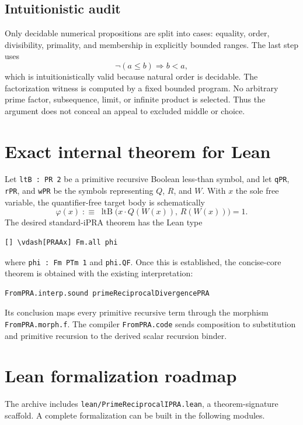 \documentclass[11pt]{article}
\theoremstyle{definition}
\newcommand{\ProdP}{Q}
\newcommand{\NumP}{R}
\newcommand{\Wit}{W}
\newcommand{\code}[1]{\texttt{#1}}
\begin{document}
\subsection{Intuitionistic audit}

Only decidable numerical propositions are split into cases: equality, order,
divisibility, primality, and membership in explicitly bounded ranges.  The
last step uses
\[
 \neg(a\leq b)\Longrightarrow b<a,
\]
which is intuitionistically valid because natural order is decidable.  The
factorization witness is computed by a fixed bounded program.  No arbitrary
prime factor, subsequence, limit, or infinite product is selected.  Thus the
argument does not conceal an appeal to excluded middle or choice.

\section{Exact internal theorem for Lean}

Let \code{ltB : PR 2} be a primitive recursive Boolean less-than symbol, and
let \code{qPR}, \code{rPR}, and \code{wPR} be the symbols representing
\(\ProdP\), \(\NumP\), and \(\Wit\).  With \(x\) the sole free variable, the
quantifier-free target body is schematically
\[
 \varphi(x)\;:\equiv\;
 \operatorname{ltB}\bigl(x\cdot \ProdP(\Wit(x)),\,
                          \NumP(\Wit(x))\bigr)=1.
\]
The desired standard-iPRA theorem has the Lean type
\begin{lstlisting}
[] \vdash[PRAAx] Fm.all phi
\end{lstlisting}
where \code{phi : Fm PTm 1} and \code{phi.QF}.  Once this is established, the
concise-core theorem is obtained with the existing interpretation:
\begin{lstlisting}
FromPRA.interp.sound primeReciprocalDivergencePRA
\end{lstlisting}
Its conclusion maps every primitive recursive term through the morphism
\code{FromPRA.morph.f}.  The compiler \code{FromPRA.code} sends composition to
substitution and primitive recursion to the derived scalar recursion binder.

\section{Lean formalization roadmap}

The archive includes \code{lean/PrimeReciprocalIPRA.lean}, a theorem-signature
scaffold.  A complete formalization can be built in the following modules.
\end{document}
